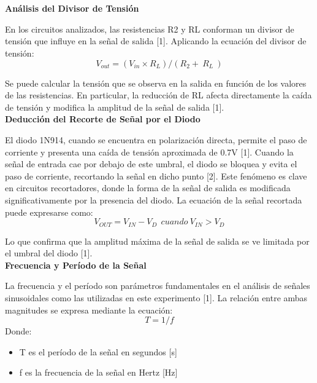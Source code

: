 \documentclass[journal]{IEEEtran}
\begin{document}
\appendices
\section{}
\noindent\textbf{Análisis del Divisor de Tensión}
\par En los circuitos analizados, las resistencias R2 y RL conforman un divisor de tensión que influye en la señal de salida [1]. Aplicando la ecuación del divisor de tensión:
\begin{equation}
    V_{out}=(V_{in}\times R_L)/(R_2+\ R_L\ )
\end{equation}
\par Se puede calcular la tensión que se observa en la salida en función de los valores de las resistencias. En particular, la reducción de RL afecta directamente la caída de tensión y modifica la amplitud de la señal de salida [1].
\\
\newline
\textbf{Deducción del Recorte de Señal por el Diodo}
\par El diodo 1N914, cuando se encuentra en polarización directa, permite el paso de corriente y presenta una caída de tensión aproximada de 0.7V [1]. Cuando la señal de entrada cae por debajo de este umbral, el diodo se bloquea y evita el paso de corriente, recortando la señal en dicho punto [2]. Este fenómeno es clave en circuitos recortadores, donde la forma de la señal de salida es modificada significativamente por la presencia del diodo. La ecuación de la señal recortada puede expresarse como:
\begin{equation}
    V_{OUT}=V_{IN}-V_{D}\ \ cuando\ V_{IN}>V_{D}
\end{equation}
\par Lo que confirma que la amplitud máxima de la señal de salida se ve limitada por el umbral del diodo [1].
\\
\newline
\textbf{Frecuencia y Período de la Señal}
\par La frecuencia y el período son parámetros fundamentales en el análisis de señales sinusoidales como las utilizadas en este experimento [1]. La relación entre ambas magnitudes se expresa mediante la ecuación:
\begin{equation}
    T=1/f
\end{equation}
Donde:
\begin{itemize}
    \item T es el período de la señal en segundos [s]
	\item  f es la frecuencia de la señal en Hertz [Hz]
\end{itemize}
\end{document}
